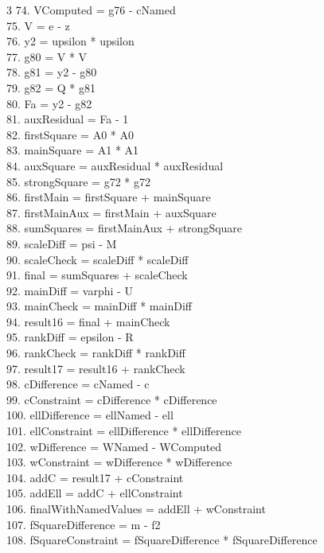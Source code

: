\documentclass[10pt]{article}
\begin{document}
\begin{multicols}{3}
74. VComputed = g76 - cNamed\\
75. V = e - z\\
76. y2 = upsilon * upsilon\\
77. g80 = V * V\\
78. g81 = y2 - g80\\
79. g82 = Q * g81\\
80. Fa = y2 - g82\\
81. auxResidual = Fa - 1\\
82. firstSquare = A0 * A0\\
83. mainSquare = A1 * A1\\
84. auxSquare = auxResidual * auxResidual\\
85. strongSquare = g72 * g72\\
86. firstMain = firstSquare + mainSquare\\
87. firstMainAux = firstMain + auxSquare\\
88. sumSquares = firstMainAux + strongSquare\\
89. scaleDiff = psi - M\\
90. scaleCheck = scaleDiff * scaleDiff\\
91. final = sumSquares + scaleCheck\\
92. mainDiff = varphi - U\\
93. mainCheck = mainDiff * mainDiff\\
94. result16 = final + mainCheck\\
95. rankDiff = epsilon - R\\
96. rankCheck = rankDiff * rankDiff\\
97. result17 = result16 + rankCheck\\
98. cDifference = cNamed - c\\
99. cConstraint = cDifference * cDifference\\
100. ellDifference = ellNamed - ell\\
101. ellConstraint = ellDifference * ellDifference\\
102. wDifference = WNamed - WComputed\\
103. wConstraint = wDifference * wDifference\\
104. addC = result17 + cConstraint\\
105. addEll = addC + ellConstraint\\
106. finalWithNamedValues = addEll + wConstraint\\
107. fSquareDifference = m - f2\\
108. fSquareConstraint = fSquareDifference * fSquareDifference\\

\end{multicols}
\end{document}
